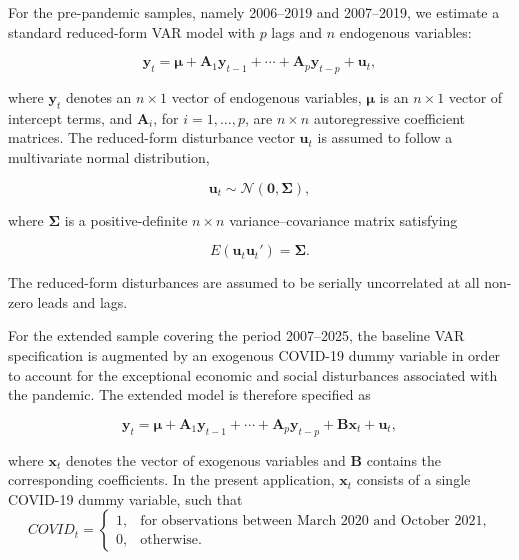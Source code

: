 \documentclass[12pt]{scrartcl}
\numberwithin{equation}{section}				%
\begin{document}
     For the pre-pandemic samples, namely 2006--2019 and 2007--2019, we estimate
     a standard reduced-form VAR model with $p$ lags and $n$ endogenous variables:
     
     \begin{equation}
     	\mathbf{y}_t = \boldsymbol{\mu} + \mathbf{A}_1\mathbf{y}_{t-1} + \cdots +
     	\mathbf{A}_p\mathbf{y}_{t-p} +\mathbf{u}_t,\end{equation}
     
     where $\mathbf{y}_t$ denotes an $n \times 1$ vector of endogenous variables,
     $\boldsymbol{\mu}$ is an $n \times 1$ vector of intercept terms, and
     $\mathbf{A}_i$, for $i=1,\ldots,p$, are $n \times n$ autoregressive
     coefficient matrices. The reduced-form disturbance vector $\mathbf{u}_t$ is
     assumed to follow a multivariate normal distribution,
     
     \begin{equation}\mathbf{u}_t \sim \mathcal{N}(\mathbf{0},\boldsymbol{\Sigma}), \end{equation}
     
     where $\boldsymbol{\Sigma}$ is a positive-definite $n \times n$
     variance--covariance matrix satisfying
     
     \begin{equation}
     	E(\mathbf{u}_t\mathbf{u}_t')
     	= \boldsymbol{\Sigma}. \end{equation}
     
     The reduced-form disturbances are assumed to be serially uncorrelated at all
     non-zero leads and lags.
     
     For the extended sample covering the period 2007--2025, the baseline VAR
     specification is augmented by an exogenous COVID-19 dummy variable in order
     to account for the exceptional economic and social disturbances associated
     with the pandemic. The extended model is therefore specified as
     
     \begin{equation}
     	\mathbf{y}_t
     	= \boldsymbol{\mu} + \mathbf{A}_1\mathbf{y}_{t-1} + \cdots + \mathbf{A}_p\mathbf{y}_{t-p} + \mathbf{B}\mathbf{x}_t + \mathbf{u}_t,
     \end{equation}
     
     where $\mathbf{x}_t$ denotes the vector of exogenous variables and
     $\mathbf{B}$ contains the corresponding coefficients. In the present
     application, $\mathbf{x}_t$ consists of a single COVID-19 dummy variable,
     such that 
      \begin{equation}
     	\mathit{COVID}_t =
     	\begin{cases}
     		1, & \text{for observations between March 2020 and October 2021}, \\
     		0, & \text{otherwise}.
     	\end{cases}
     	\label{eq:covid_dummy}
     \end{equation}
     
\end{document}
